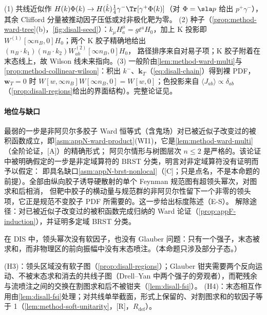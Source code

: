 \begin{proofsketch}
(1) 共线近似作 $H(k)\Phi(k)\to H(\hat k)\frac14\gamma^-\Tr[\gamma^+\Phi(k)]$（对 $\Phi=\sla p$ 给出 $p^+\gamma^-$），其余 Clifford 分量被推动因子压低或对非极化靶为零。
(2) 种子（\cref{prop:method-ward-tree}(b)，\cref{fig:disall-seed}）：$k_\mu H^\mu_a=gt^aH_0$，加上 K 投影即 $W^{(1)}[\infty n_B,0]H_0$；两个 K 胶子精确地给出 $(n_B\cdot k_1)(n_B\cdot k_2)W^{(2)}_{ab}[\infty n_B,0]H_0$，
路径排序来自对易子项；K 胶子附着在末态线上，故 Wilson 线未来指向。(3) 一般阶由\cref{lem:method-ward-multi}与\cref{prop:method-collinear-wilson}：积出 $k^-$、$\mathbf k_T$（\cref{eq:disall-chain}）得到裸 PDF，
$\mathbf w_T=0$ 时 $W[w,\infty n_B]W[\infty n_B,0]=W[w,0]$；色投影来自 $\langle J_{ab}\rangle\propto\delta_{ab}$（\cref{prop:disall-regions}给出的界面结构）。完整论证见\cite[第~11.3、11.9~节]{Collins2011}。
\end{proofsketch}

\paragraph{地位与缺口}
最弱的一步是非阿贝尔多胶子 Ward 恒等式（含鬼场）对已被近似子改变过的被积函数成立，即\cref{asm:appN-ward-product}(WI1)，它是\cref{lem:method-ward-multi}（全阶论证，[A]）的精确形式；
阿贝尔情形与树图层次 $n\le2$ 是严格的。该论证中被明确假定的一步是非定域算符的 BRST 分类，\cite[第~11.3.2~节，第~407--410~页]{Collins2011}明言对非定域算符没有证明而予以假定：
即具名缺口\cref{asm:appN-brst-nonlocal}（[C]；只是点名，不是本命题的前提）。全部由纵向胶子诱导硬散射的单个 Feynman 规范图有超领头幂次，对图求和后相消，
但靶中胶子的横动量与规范群的非阿贝尔性留下一个非零的领头项，它正是规范不变胶子 PDF 所需要的\cite{Collins:2008sg}。这一步给出标度陈述（E-S）。
解除途径：对已被近似子改变过的被积函数完成归纳的 Ward 论证（\cref{prop:appF-induction}），并证明多定域 BRST 分类。

\begin{proposition}\label{prop:disall-h3h4}
在 DIS 中，领头幂次没有软因子，也没有 Glauber 问题：只有一个强子，末态被求和，而非物理区的前向振幅中没有末态喷注。（本命题只涉及部分子态。）
\end{proposition}

\begin{proofsketch}
(H3)：领头区域没有软子图（\cref{prop:disall-regions}）；Glauber 钳夹需要两个反向运动、不被末态求和消去的共线子图（Drell--Yan 中两个强子的旁观者），而靶残余与流喷注之间的交换在割图求和后不被钳夹（\cref{lem:disall-fsi}）。
(H4)：末态相互作用由\cref{lem:disall-fsi}处理；对共线单举截面，形式上保留的、对割图求和的软因子等于 1（\cref{lem:method-soft-unitarity}，[R]，$R_{\mathrm{def}}$）。
\end{proofsketch}

